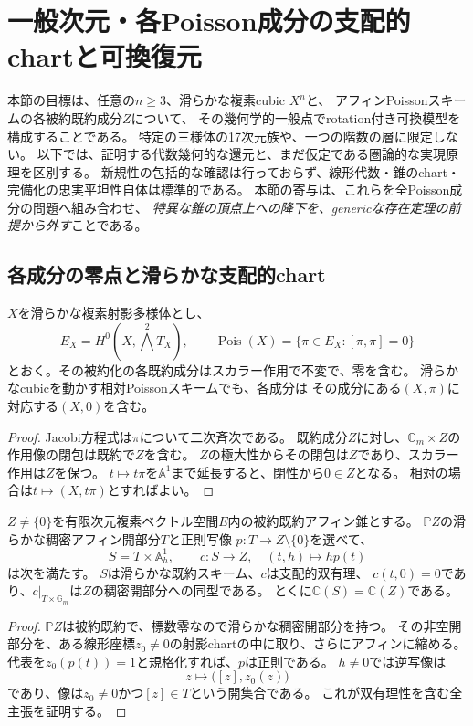 \section{一般次元・各Poisson成分の支配的chartと可換復元}
\label{sec:all-poisson-components}

本節の目標は、任意の$n\ge3$、滑らかな複素cubic $X^n$と、
アフィンPoissonスキームの各被約既約成分$Z$について、
その幾何学的一般点でrotation付き可換模型を構成することである。
特定の三様体の17次元族や、一つの階数の層に限定しない。
以下では、証明する代数幾何的な還元と、まだ仮定である圏論的な実現原理を区別する。
新規性の包括的な確認は行っておらず、線形代数・錐のchart・完備化の忠実平坦性自体は標準的である。
本節の寄与は、これらを全Poisson成分の問題へ組み合わせ、
\emph{特異な錐の頂点上への降下を、genericな存在定理の前提から外す}ことである。

\subsection{各成分の零点と滑らかな支配的chart}

\begin{proposition}[Poisson錐の成分と零点]
\label{prop:all-components-cone}
$X$を滑らかな複素射影多様体とし、
\[
 E_X=H^0(X,\textstyle\bigwedge^2T_X),\qquad
 \operatorname{Pois}(X)=\{\pi\in E_X:[\pi,\pi]=0\}
\]
とおく。その被約化の各既約成分はスカラー作用で不変で、零を含む。
滑らかなcubicを動かす相対Poissonスキームでも、各成分は
その成分にある$(X,\pi)$に対応する$(X,0)$を含む。
\end{proposition}
\begin{proof}
Jacobi方程式は$\pi$について二次斉次である。
既約成分$Z$に対し、$\mathbb G_m\times Z$の作用像の閉包は既約で$Z$を含む。
$Z$の極大性からその閉包は$Z$であり、スカラー作用は$Z$を保つ。
$t\mapsto t\pi$を$\mathbb A^1$まで延長すると、閉性から$0\in Z$となる。
相対の場合は$t\mapsto(X,t\pi)$とすればよい。
\end{proof}

\begin{theorem}[滑らかなスカラーchart]
\label{cw:thm:chart}
$Z\ne\{0\}$を有限次元複素ベクトル空間$E$内の被約既約アフィン錐とする。
$\mathbb PZ$の滑らかな稠密アフィン開部分$T$と正則写像
$p:T\to Z\setminus\{0\}$を選べて、
\[
 S=T\times\mathbb A^1_h,\qquad
 c:S\longrightarrow Z,\quad (t,h)\longmapsto h p(t)
 \tag{C}\label{cw:eq:contraction}
\]
は次を満たす。
$S$は滑らかな既約スキーム、$c$は支配的双有理、
$c(t,0)=0$であり、$c|_{T\times\mathbb G_m}$は$Z$の稠密開部分への同型である。
とくに$\mathbb C(S)=\mathbb C(Z)$である。
\end{theorem}
\begin{proof}
$\mathbb PZ$は被約既約で、標数零なので滑らかな稠密開部分を持つ。
その非空開部分を、ある線形座標$z_0\ne0$の射影chartの中に取り、さらにアフィンに縮める。
代表を$z_0(p(t))=1$と規格化すれば、$p$は正則である。
$h\ne0$では逆写像は
\[
 z\longmapsto\bigl([z],z_0(z)\bigr)
\]
であり、像は$z_0\ne0$かつ$[z]\in T$という開集合である。
これが双有理性を含む全主張を証明する。
\end{proof}

